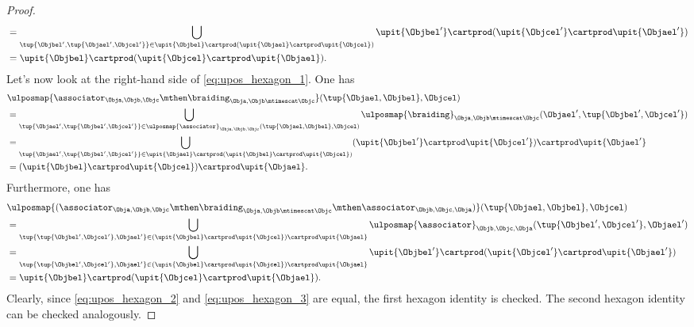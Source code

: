\begin{proof}
\begin{equation}
\begin{aligned}
&=\bigcup_{\tup{\Objbel',\tup{\Objael',\Objcel'}}\in \upit\{\Objbel\} \cartprod (\upit \{\Objael\}\cartprod \upit\{ \Objcel\})} \upit\{\Objbel'\}\cartprod (\upit\{\Objcel'\}\cartprod \upit\{\Objael'\})\\
&=\upit\{\Objbel\} \cartprod (\upit \{\Objcel\}\cartprod \upit\{ \Objael\}).
\end{aligned}
\end{equation}
Let's now look at the right-hand side of \cref{eq:upos_hexagon_1}.
One has
\begin{equation*}
\begin{aligned}
&\ulposmap{\associator_{\Obja,\Objb,\Objc} \mthen \braiding_{\Obja,\Objb\mtimescat \Objc}}(\tup{\Objael,\Objbel},\Objcel)\\
&=\bigcup_{\tup{\Objael',\tup{\Objbel',\Objcel'}}\in \ulposmap{\associator}_{\Obja,\Objb,\Objc}(\tup{\Objael,\Objbel},\Objcel)}\ulposmap{\braiding}_{\Obja,\Objb\mtimescat\Objc}(\Objael',\tup{\Objbel',\Objcel'})\\
&=\bigcup_{\tup{\Objael',\tup{\Objbel',\Objcel'}}\in \upit\{\Objael\} \cartprod (\upit \{ \Objbel\}\cartprod \upit\{ \Objcel\})} (\upit\{\Objbel'\} \cartprod \upit \{ \Objcel'\})\cartprod \upit\{ \Objael'\}\\
&=(\upit\{\Objbel\} \cartprod \upit \{ \Objcel\})\cartprod \upit\{ \Objael\}.
\end{aligned}
\end{equation*}
Furthermore, one has
\begin{equation}
\label{eq:upos_hexagon_3}
\begin{aligned}
&\ulposmap{(\associator_{\Obja,\Objb,\Objc} \mthen \braiding_{\Obja,\Objb\mtimescat \Objc}\mthen \associator_{\Objb,\Objc,\Obja})}(\tup{\Objael,\Objbel},\Objcel)\\
&=\bigcup_{\tup{\tup{\Objbel',\Objcel'},\Objael'}\in (\upit\{\Objbel\} \cartprod \upit \{ \Objcel\})\cartprod \upit\{ \Objael\}}\ulposmap{\associator}_{\Objb,\Objc,\Obja}(\tup{\Objbel',\Objcel'},\Objael')\\
&=\bigcup_{\tup{\tup{\Objbel',\Objcel'},\Objael'}\in (\upit\{\Objbel\} \cartprod \upit \{ \Objcel\})\cartprod \upit\{ \Objael\}}\upit\{\Objbel'\}\cartprod (\upit\{\Objcel'\}\cartprod \upit\{\Objael'\})\\
&=\upit\{\Objbel\} \cartprod (\upit \{\Objcel\}\cartprod \upit\{ \Objael\}).
\end{aligned}
\end{equation}
Clearly, since \cref{eq:upos_hexagon_2} and \cref{eq:upos_hexagon_3} are equal, the first hexagon identity is checked.
The second hexagon identity can be checked analogously.
\end{proof}

